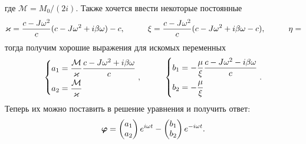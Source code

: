 где $\mathcal M = M_0 / (2 i)$. Также хочется ввести некоторые постоянные
\begin{equation*}
    \kappa = \frac{c - J \omega^2}{c} (c - J \omega^2 + i \beta \omega) - c,
    \hspace{1 cm}
    \xi = \frac{c - J \omega^2}{c} (c - J \omega^2 + i \beta \omega - c),
    \hspace{1 cm}
    \eta = 
\end{equation*}
тогда получим хорошие выражения для искомых переменных
\begin{equation*}
    \left\{\begin{aligned}
        a_1 &= \frac{\mathcal M}{\kappa} \frac{c - J \omega^2 + i \beta \omega}{c} \\
        a_2 &= \frac{\mathcal M}{\kappa}
    \end{aligned}\right.
    , \hspace{1 cm}
    \left\{\begin{aligned}
         b_1 &= - \frac{\mu}{\xi} \frac{c - J \omega^2 - i \beta \omega}{c} \\
       b_2 &= - \frac{\mu}{\xi}
    \end{aligned}\right. .
\end{equation*}
Теперь их можно поставить в решение уравнения и получить ответ:
\begin{equation*}
    \vc{\varphi} = \begin{pmatrix}
        a_1 \\ a_2
    \end{pmatrix} e^{i\omega t} - 
    \begin{pmatrix}
        b_1 \\ b_2
    \end{pmatrix} e^{-i\omega t}.
\end{equation*}